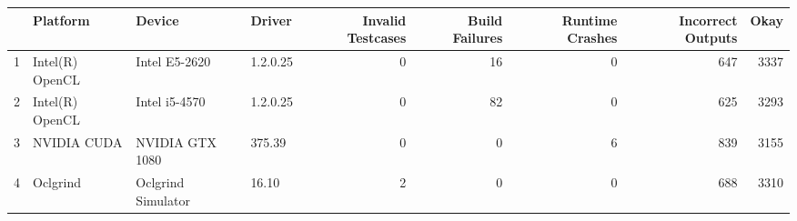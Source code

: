 \begin{tabular}{llllrrrrr}
\toprule
{} &         Platform &              Device &    Driver &  Invalid Testcases &  Build Failures &  Runtime Crashes &  Incorrect Outputs &  Okay \\
\midrule
1 &  Intel(R) OpenCL &       Intel E5-2620 &  1.2.0.25 &                  0 &              16 &                0 &                647 &  3337 \\
2 &  Intel(R) OpenCL &       Intel i5-4570 &  1.2.0.25 &                  0 &              82 &                0 &                625 &  3293 \\
3 &      NVIDIA CUDA &     NVIDIA GTX 1080 &    375.39 &                  0 &               0 &                6 &                839 &  3155 \\
4 &         Oclgrind &  Oclgrind Simulator &     16.10 &                  2 &               0 &                0 &                688 &  3310 \\
\bottomrule
\end{tabular}
